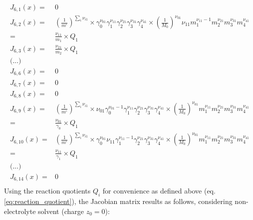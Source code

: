\documentclass[onecolumn]{article}
\begin{document}
\[
\begin{aligned}
J_{6,1}(x) = & 0 \\
J_{6,2}(x) = &
\left(\frac{1}{m^{\circ}}\right)^{\sum_i{\nu_{i1}}}\times
\gamma_0^{\nu_{01}}\gamma_1^{\nu_{11}}\gamma_2^{\nu_{21}}
\gamma_3^{\nu_{31}}\gamma_4^{\nu_{41}}\times
\left(\frac{1}{M_0}\right)^{\nu_{01}}
\nu_{11}m_1^{\nu_{11}-1}m_2^{\nu_{21}}
m_3^{\nu_{31}}m_4^{\nu_{41}}\\
= & \frac{\nu_{11}}{m_{1}} \times Q_1\\
J_{6,3}(x) =& \frac{\nu_{21}}{m_2} \times Q_1\\
\text{(...)}\\
J_{6,6}(x) =& 0\\
J_{6,7}(x) =& 0\\
J_{6,8}(x) =& 0\\
J_{6,9}(x) =&
\left(\frac{1}{m^{\circ}}\right)^{\sum_i{\nu_{i1}}}\times
\nu_{01}\gamma_0^{\nu_{01}-1}\gamma_1^{\nu_{11}}\gamma_2^{\nu_{21}}
\gamma_3^{\nu_{31}}\gamma_4^{\nu_{41}}\times
\left(\frac{1}{M_0}\right)^{\nu_{01}}m_1^{\nu_{11}}m_2^{\nu_{21}}
m_3^{\nu_{31}}m_4^{\nu_{41}}\\
= & \frac{\nu_{01}}{\gamma_{0}} \times Q_1\\
J_{6,10}(x) =&
\left(\frac{1}{m^{\circ}}\right)^{\sum_i{\nu_{i1}}}\times
\gamma_0^{\nu_{01}}\nu_{11}\gamma_1^{\nu_{11}-1}\gamma_2^{\nu_{21}}
\gamma_3^{\nu_{31}}\gamma_4^{\nu_{41}}\times
\left(\frac{1}{M_0}\right)^{\nu_{01}}m_1^{\nu_{11}}m_2^{\nu_{21}}
m_3^{\nu_{31}}m_4^{\nu_{41}}\\
= & \frac{\nu_{11}}{\gamma_{1}} \times Q_1\\
\text{(...)}\\
J_{6,14}(x) =&  0\\
\end{aligned}
\]
Using the reaction quotients $Q_i$ for convenience as defined above (eq.
\ref{eq:reaction_quotient}), the Jacobian matrix results as follows,
considering non-electrolyte solvent (charge $z_0=0$):
\end{document}

